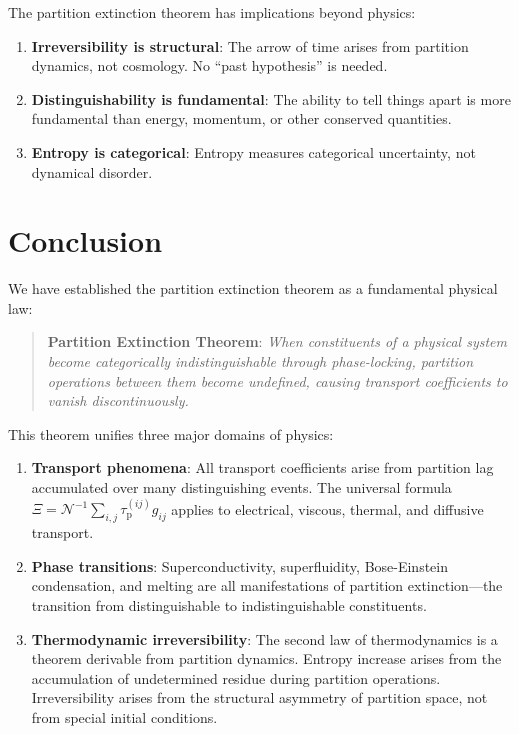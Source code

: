 \documentclass[twocolumn,10pt,aps,prd,superscriptaddress,nofootinbib]{revtex4-2}
\theoremstyle{remark}
\newcommand{\tauP}{\tau_{\mathrm{p}}}
\newcommand{\Gij}{g_{ij}}
\newcommand{\Norm}{\mathcal{N}}
\newcommand{\Transp}{\Xi}
\begin{document}
The partition extinction theorem has implications beyond physics:

\begin{enumerate}
\item \textbf{Irreversibility is structural}: The arrow of time arises from partition dynamics, not cosmology. No ``past hypothesis'' is needed.

\item \textbf{Distinguishability is fundamental}: The ability to tell things apart is more fundamental than energy, momentum, or other conserved quantities.

\item \textbf{Entropy is categorical}: Entropy measures categorical uncertainty, not dynamical disorder.
\end{enumerate}


\section{Conclusion}
\label{sec:conclusion}

We have established the partition extinction theorem as a fundamental physical law:

\begin{quote}
\textbf{Partition Extinction Theorem}: \emph{When constituents of a physical system become categorically indistinguishable through phase-locking, partition operations between them become undefined, causing transport coefficients to vanish discontinuously.}
\end{quote}

This theorem unifies three major domains of physics:

\begin{enumerate}
\item \textbf{Transport phenomena}: All transport coefficients arise from partition lag accumulated over many distinguishing events. The universal formula $\Transp = \Norm^{-1} \sum_{i,j} \tauP^{(ij)} \Gij$ applies to electrical, viscous, thermal, and diffusive transport.

\item \textbf{Phase transitions}: Superconductivity, superfluidity, Bose-Einstein condensation, and melting are all manifestations of partition extinction---the transition from distinguishable to indistinguishable constituents.

\item \textbf{Thermodynamic irreversibility}: The second law of thermodynamics is a theorem derivable from partition dynamics. Entropy increase arises from the accumulation of undetermined residue during partition operations. Irreversibility arises from the structural asymmetry of partition space, not from special initial conditions.
\end{enumerate}
\end{document}
